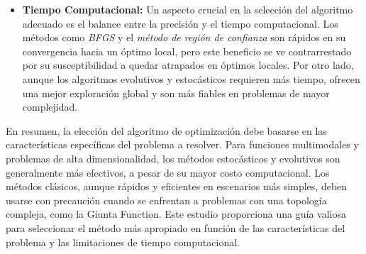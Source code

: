 \documentclass[fontsize=10pt]{article}
\begin{document}
\begin{itemize}
    \item \textbf{Tiempo Computacional:} Un aspecto crucial en la selección del algoritmo adecuado es el balance entre la precisión y el tiempo computacional. Los métodos como \textit{BFGS} y el \textit{método de región de confianza} son rápidos en su convergencia hacia un óptimo local, pero este beneficio se ve contrarrestado por su susceptibilidad a quedar atrapados en óptimos locales. Por otro lado, aunque los algoritmos evolutivos y estocásticos requieren más tiempo, ofrecen una mejor exploración global y son más fiables en problemas de mayor complejidad.

\end{itemize}

En resumen, la elección del algoritmo de optimización debe basarse en las características específicas del problema a resolver. Para funciones multimodales y problemas de alta dimensionalidad, los métodos estocásticos y evolutivos son generalmente más efectivos, a pesar de su mayor costo computacional. Los métodos clásicos, aunque rápidos y eficientes en escenarios más simples, deben usarse con precaución cuando se enfrentan a problemas con una topología compleja, como la Giunta Function. Este estudio proporciona una guía valiosa para seleccionar el método más apropiado en función de las características del problema y las limitaciones de tiempo computacional.
\end{document}
